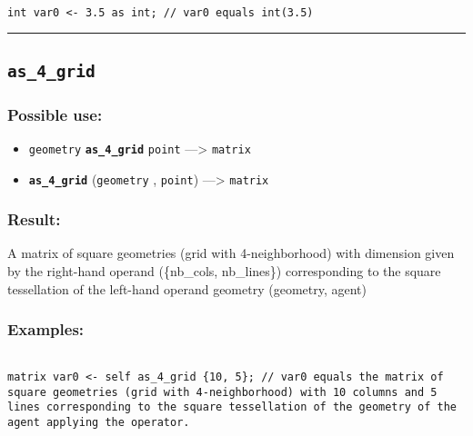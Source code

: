 \documentclass[]{book}
\providecommand{\tightlist}{%
  \setlength{\itemsep}{0pt}\setlength{\parskip}{0pt}}
\theoremstyle{definition}
\theoremstyle{definition}
\theoremstyle{definition}
\theoremstyle{remark}
\begin{document}
\begin{verbatim}
 
int var0 <- 3.5 as int; // var0 equals int(3.5)
\end{verbatim}

\begin{center}\rule{0.5\linewidth}{\linethickness}\end{center}

\subsection{\texorpdfstring{\texttt{as\_4\_grid}}{as\_4\_grid}}\label{as_4_grid}

\subsubsection{Possible use:}\label{possible-use-44}

\begin{itemize}
\tightlist
\item
  \texttt{geometry} \textbf{\texttt{as\_4\_grid}} \texttt{point}
  ---\textgreater{} \texttt{matrix}
\item
  \textbf{\texttt{as\_4\_grid}} (\texttt{geometry} , \texttt{point})
  ---\textgreater{} \texttt{matrix}
\end{itemize}

\subsubsection{Result:}\label{result-43}

A matrix of square geometries (grid with 4-neighborhood) with dimension
given by the right-hand operand (\{nb\_cols, nb\_lines\}) corresponding
to the square tessellation of the left-hand operand geometry (geometry,
agent)

\subsubsection{Examples:}\label{examples-36}

\begin{verbatim}
 
matrix var0 <- self as_4_grid {10, 5}; // var0 equals the matrix of square geometries (grid with 4-neighborhood) with 10 columns and 5 lines corresponding to the square tessellation of the geometry of the agent applying the operator.
\end{verbatim}
\end{document}
